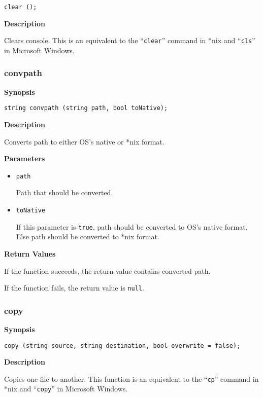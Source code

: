 \documentclass[a4paper, 10pt, titlepage]{article}
\begin{document}
\begin{verbatim}
clear ();
\end{verbatim}

\textbf{Description}

Clears console. This is an equivalent to the ``\texttt{clear}'' command in *nix and ``\texttt{cls}'' in Microsoft Windows.

\subsubsection{convpath}

\textbf{Synopsis}

\begin{verbatim}
string convpath (string path, bool toNative);
\end{verbatim}

\textbf{Description}

Converts path to either OS's native or *nix format.

\textbf{Parameters}

\begin{itemize}
\item \texttt{path}

Path that should be converted.

\item \texttt{toNative}

If this parameter is \texttt{true}, path should be converted to OS's native format. Else path should be converted to *nix format.
\end{itemize}

\textbf{Return Values}

If the function succeeds, the return value contains converted path.

If the function fails, the return value is \texttt{null}.

\subsubsection{copy}

\textbf{Synopsis}

\begin{verbatim}
copy (string source, string destination, bool overwrite = false);
\end{verbatim}

\textbf{Description}

Copies one file to another. This function is an equivalent to the ``\texttt{cp}'' command in *nix and ``\texttt{copy}'' in Microsoft Windows.
\end{document}
